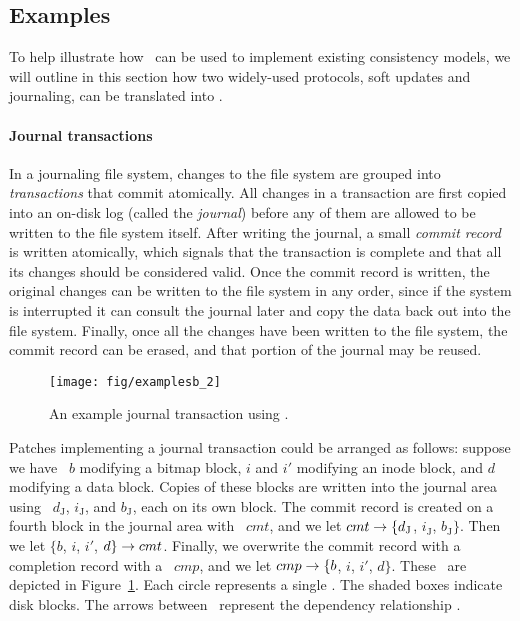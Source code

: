 \subsection{Examples}
\label{sec:patch:examples}

To help illustrate how \patches\ can be used to implement existing consistency
models, we will outline in this section how two widely-used protocols, soft
updates and journaling, can be translated into \patches.

\paragraph{Journal transactions}
%
In a journaling file system, changes to the file system are grouped into
\emph{transactions} that commit atomically.
%
%
All changes in a transaction are first copied into an on-disk log (called the
\emph{journal}) before any of them are allowed to be written to the file
system itself.
%
After writing the journal, a small \emph{commit record} is written atomically,
which signals that the transaction is complete and that all its changes should
be considered valid.
%
Once the commit record is written, the original changes can be written to the
file system in any order, since if the system is interrupted it can consult
the journal later and copy the data back out into the file system.
%
Finally, once all the changes have been written to the file system, the commit
record can be erased, and that portion of the journal may be reused.

\begin{figure}[htb]
  \centering
  \texttt{[image: fig/examplesb\_2]}
  \caption{\label{fig:journal} An example journal transaction using \patches.}
\end{figure}

Patches implementing a journal transaction could be arranged as follows:
%
suppose we have \patch\ $b$ modifying a bitmap block, $i$ and $i'$
modifying an inode block, and $d$ modifying a data block.
%
Copies of these blocks are written into the journal area using \patches\
$d_\textrm{J}$, $i_\textrm{J}$, and $b_\textrm{J}$, each on its
own block.
%
The commit record is created on a fourth block in the journal area with
\patch\ $cmt$, and we let $cmt \rightarrow \{d_\textrm{J}$,
$i_\textrm{J}$, $b_\textrm{J}\}$.
%
Then we let $\{b$, $i$, $i'$, $d\} \rightarrow cmt$.
%
Finally, we overwrite the commit record with a completion record with a
\patch\ $cmp$, and we let $cmp \rightarrow \{b$, $i$, $i'$,
$d\}$.
%
These \patches\ are depicted in Figure~\ref{fig:journal}.
%
Each circle represents a single \patch. The shaded boxes indicate disk blocks.
%
The arrows between \patches\ represent the dependency relationship \PDDepend.


